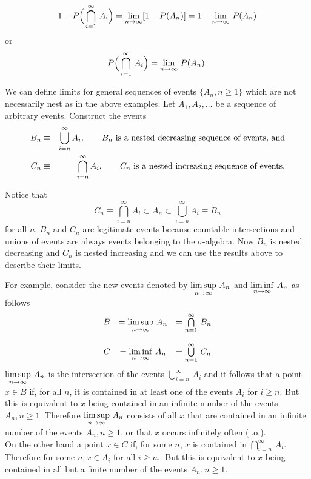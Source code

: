 $$1- P\Big( \bigcap\limits_{i=1}^\infty\, A_i  \Big) = \lim_{n\rightarrow\infty} [1 - P(A_n)] = 1 - \lim_{n\rightarrow\infty}\, P(A_n)$$ or 
$$P\Big( \bigcap\limits_{i=1}^\infty\, A_i  \Big) = \lim_{n\rightarrow\infty}\, P(A_n).$$

We can define limits for general sequences of events $\{A_n, n\ge 1\}$ which are not necessarily nest as in the above examples. Let $A_1, A_2, \hdots$ be a sequence of arbitrary events. Construct the events
\begin{eqnarray*}
B_n &\equiv& \bigcup\limits_{i=n}^\infty A_i, \quad\quad\hbox{$B_n$ is a nested decreasing sequence of events, and}\\
C_n &\equiv& \bigcap\limits_{i=n}^\infty A_i, \quad\quad\hbox{$C_n$ is a nested increasing sequence of events.}
\end{eqnarray*}

Notice that $$C_n \equiv \bigcap\limits_{i=n}^\infty A_i \subset A_n \subset \bigcup\limits_{i=n}^\infty A_i \equiv B_n$$for all $n$. $B_n$ and $C_n$ are legitimate events because countable intersections and unions of events are always events belonging to the $\sigma$-algebra. Now $B_n$ is nested decreasing and $C_n$ is nested increasing and we can use the results above to describe their limits. 

For example, consider the new events denoted by $\displaystyle{\limsup_{n\rightarrow\infty}\, A_n}$ and $\displaystyle{\liminf_{n\rightarrow\infty}\, A_n}$ as follows
$$\begin{array}{rcl}
B &= \displaystyle{\limsup_{n\rightarrow\infty}\, A_n} &= \bigcap\limits_{n=1}^\infty \, B_n \\ \\
C &= \displaystyle{\liminf_{n\rightarrow\infty}\, A_n} &= \bigcup\limits_{n=1}^\infty \, C_n\\
\end{array}$$ 
$\displaystyle{\limsup_{n\rightarrow\infty}\, A_n}$ is the intersection of the events $\bigcup\limits_{i=n}^\infty\, A_i$ and it follows that a point $x\in B$ if, for all $n$, it is contained in at least one of the events $A_i$ for $i\ge n$. But this is equivalent to $x$ being contained in an infinite number of the events $A_n, n\ge1$. Therefore $\displaystyle{\limsup_{n\rightarrow\infty}\, A_n}$ consists of all $x$ that are contained in an infinite number of the events $A_n, n\ge 1$, or that $x$ occurs {\elevenit infinitely often} (i.o.).\\

On the other hand a point $x\in C$ if, for some $n$, $x$ is contained in $\bigcap\limits_{i=n}^\infty\,A_i$. Therefore for some $n, x \in A_i$ for all $i\ge n$.. But this is equivalent to $x$ being contained in all but a finite number of the events $A_n, n\ge1$.\\

